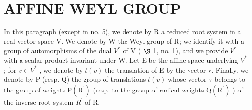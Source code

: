\section{AFFINE WEYL GROUP}

In this paragraph (except in no. 5), we denote by R a reduced root system in a real vector space V. We denote by W the Weyl group of R; we identify it with a group of automorphisms of the dual \(V^{*}\) of V ( \(\S\) 1, no. 1), and we provide \(V^{*}\) with a scalar product invariant under W. Let E be the affine space underlying \(V^{*}\) ; for \(v \in V^{*}\) , we denote by \(t(v)\) the translation of E by the vector v. Finally, we denote by P (resp. Q) the group of translations \(t(v)\) whose vector v belongs to the group of weights \(\mathrm{P}(\mathrm{R}^{\prime})\) (resp. to the group of radical weights \(\mathrm{Q}(\mathrm{R}^{\prime})\) ) of the inverse root system \(R^{\prime}\) of R.


